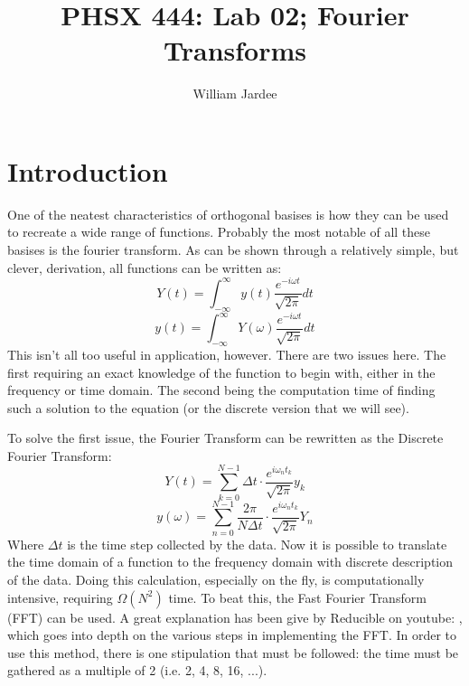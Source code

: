 \documentclass[12pt]{article}
\begin{document}
    
    \title{PHSX 444: Lab 02; Fourier Transforms}
    \author{William Jardee}
    \maketitle
    
    \section{Introduction}
    
    One of the neatest characteristics of orthogonal basises is how they can be used to recreate a wide range of functions. Probably the most notable of all these basises is the fourier transform. As can be shown through a relatively simple, but clever, derivation, all functions can be written as:
    \begin{equation*}
        Y(t) = \int^\infty_{-\infty} y(t) \frac{e^{-i\omega t}}{\sqrt{2\pi}} dt
        \label{eq:fourier_time}
    \end{equation*}
    \begin{equation*}
        y(t) = \int^\infty_{-\infty} Y(\omega) \frac{e^{-i\omega t}}{\sqrt{2\pi}} dt
        \label{eq:fourier_freq}
    \end{equation*}
    This isn't all too useful in application, however. There are two issues here. The first requiring an exact knowledge of the function to begin with, either in the frequency or time domain. The second being the computation time of finding such a solution to the equation (or the discrete version that we will see).
    
    To solve the first issue, the Fourier Transform can be rewritten as the Discrete Fourier Transform:
    \begin{equation*}
        Y(t) = \sum^{N-1}_{k=0} \Delta t \cdot \frac{e^{i \omega_n t_k}}{\sqrt{2\pi}} y_k 
    \end{equation*}
    \begin{equation*}
        y(\omega) = \sum^{N-1}_{n=0} \frac{2 \pi}{N \Delta t} \cdot \frac{e^{i \omega_n t_k}}{\sqrt{2\pi}} Y_n
    \end{equation*}
    Where $\Delta t$ is the time step collected by the data. Now it is possible to translate the time domain of a function to the frequency domain with discrete description of the data. Doing this calculation, especially on the fly, is computationally intensive, requiring $\Omega(N^2)$ time. To beat this, the Fast Fourier Transform (FFT) can be used. A great explanation has been give by Reducible on youtube: \cite{youtube}, which goes into depth on the various steps in implementing the FFT. In order to use this method, there is one stipulation that must be followed: the time must be gathered as a multiple of 2 (i.e. 2, 4, 8, 16, ...). 
    
\end{document}
